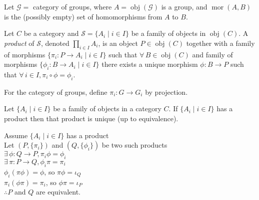 \documentclass[letterpaper,12pt,fleqn]{article}
\DeclareMathOperator{\obj}{obj}
\DeclareMathOperator{\mor}{mor}
\renewcommand{\i}{\iota}
\begin{document}
\begin{example}
  Let $\mathcal{G}=$ category of groups, where $A=\obj(\mathcal{G})$ is a
  group, and $\mor(A,B)$ is the (possibly empty) set of homomorphisms from
  $A$ to $B$.
\end{example}

\begin{definition}[Product]
  Let $C$ be a category and $\mathcal{S}=\{A_i\mid i\in I\}$ be a family of
  objects in $\obj(C)$. A \emph{product} of $\mathcal{S}$, denoted
  $\prod_{i\in I}A_i$, is an object $P\in\obj(C)$ together with a family of
  morphisms $\{\pi_i:P\to A_i\mid i\in I\}$ such that $\forall\,B\in\obj(C)$
  and family of morphisms $\{\phi_i:B\to A_i\mid i\in I\}$ there exists a
  unique morphism $\phi:B\to P$ such that
  $\forall\,i\in I,\pi_i\circ\phi=\phi_i$.
\end{definition}

\begin{figure}[h]
  \setlength{\leftskip}{1in}
\end{figure}

For the category of groups, define $\pi_i:G\to G_i$ by projection.

\begin{theorem}
  Let $\{A_i\mid i\in I\}$ be a family of objects in a category $C$. If
  $\{A_i\mid i\in I\}$ has a product then that product is unique (up to
  equivalence).
\end{theorem}

\begin{theproof}
  Assume $\{A_i\mid i\in I\}$ has a product \\
  Let $(P,\{\pi_i\})$ and $(Q,\{\phi_i\})$ be two such products \\
  $\exists\,\phi:Q\to P,\pi_i\phi=\phi_i$ \\
  $\exists\,\pi:P\to Q,\phi_i\pi=\pi_i$ \\
  $\phi_i(\pi\phi)=\phi$, so $\pi\phi=\i_Q$ \\
  $\pi_i(\phi\pi)=\pi_i$, so $\phi\pi=\i_P$ \\
  $\therefore P$ and $Q$ are equivalent.
\end{theproof}
\end{document}
